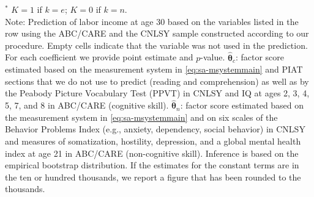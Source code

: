 \documentclass[static]{JJH-Beamer}
\begin{document}
\begin{frame}
\begin{table}[H]
\begin{center}
\end{center}
\tiny \flushleft
$^\ast$ $K=1$ if $k=e$; $K=0$ if $k=n$.\\
Note: Prediction of labor income at age 30 based on the variables listed in the row using the ABC/CARE and the CNLSY sample constructed according to our procedure. Empty cells indicate that the variable was not used in the prediction. For each coefficient we provide point estimate and $p$-value. $\hat{\bm{\theta}}_{c}$: factor score estimated based on the measurement system in \eqref{eq:sa-msystemmain} and PIAT sections that we do not use to predict (reading and comprehension) as well as by the Peabody Picture Vocabulary Test (PPVT) in CNLSY and IQ at ages 2, 3, 4, 5, 7, and 8 in ABC/CARE (cognitive skill). $\hat{\bm{\theta}}_{n}$: factor score estimated based on the measurement system in \eqref{eq:sa-msystemmain} and on six scales of the Behavior Problems Index (e.g., anxiety, dependency, social behavior) in CNLSY and measures of somatization, hostility, depression, and a global mental health index at age 21 in ABC/CARE (non-cognitive skill). Inference is based on the empirical bootstrap distribution. If the estimates for the constant terms are in the ten or hundred thousands, we report a figure that has been rounded to the thousands.\\
\end{table}

\end{frame}
\end{document}
